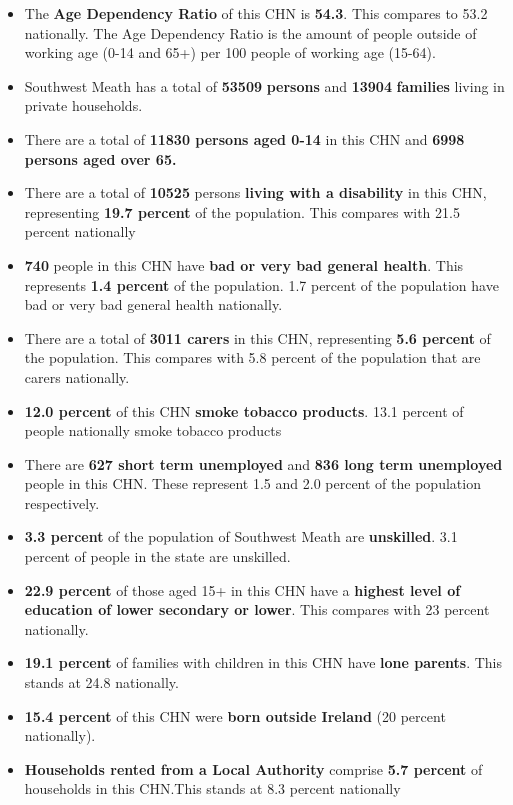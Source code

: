 \documentclass{article}
\begin{document}
\begin{itemize}

\item The \textbf{Age Dependency Ratio} of this CHN is  \textbf{54.3}. This compares to 53.2 nationally. The Age Dependency Ratio is the amount of people outside of working age (0-14 and 65+) per 100 people of working age (15-64). 

\item Southwest Meath has a total of \textbf{\num{53509}} \textbf{persons} and  \textbf{\num{13904}} \textbf{families} living in private households.

\item There are a total of \textbf{\num{11830} persons aged 0-14} in this CHN and \textbf{\num{6998} persons aged over 65.} 

\item There are a total of \textbf{\num{10525}} persons \textbf{living with a disability} in this CHN, representing \textbf{19.7 percent} of the population. This compares with  21.5 percent nationally

\item \textbf{\num{740}} people in this CHN have \textbf{bad or very bad general health}. This represents \textbf{1.4 percent} of the population. 1.7 percent of the population have bad or very bad general health nationally. 

\item There are a total of \textbf{\num{3011} carers} in this CHN, representing \textbf{5.6 percent} of the population. This compares with 5.8 percent of the population that are carers nationally. 

\item \textbf{12.0 percent} of this CHN \textbf{smoke tobacco products}. 13.1 percent of people nationally smoke tobacco products

\item There are \textbf{\num{627} short term unemployed} and \textbf{\num{836} long term unemployed} people in this CHN. These represent 1.5 and 2.0 percent of the population respectively.

\item  \textbf{3.3 percent} of the population of Southwest Meath are \textbf{unskilled}. 3.1 percent of people in the state are unskilled.

\item \textbf{22.9 percent} of those aged 15+ in this CHN have a \textbf{highest level of education of lower secondary or lower}. This compares with 23 percent nationally. 

\item \textbf{19.1 percent} of families with children in this CHN have \textbf{lone parents}. This stands at 24.8 nationally.

\item \textbf{15.4 percent} of this CHN were \textbf{born outside Ireland} (20 percent nationally).

\item \textbf{Households rented from a Local Authority} comprise \textbf{5.7 percent} of households in this CHN.This stands at 8.3 percent nationally

\end{itemize}
\end{document}
